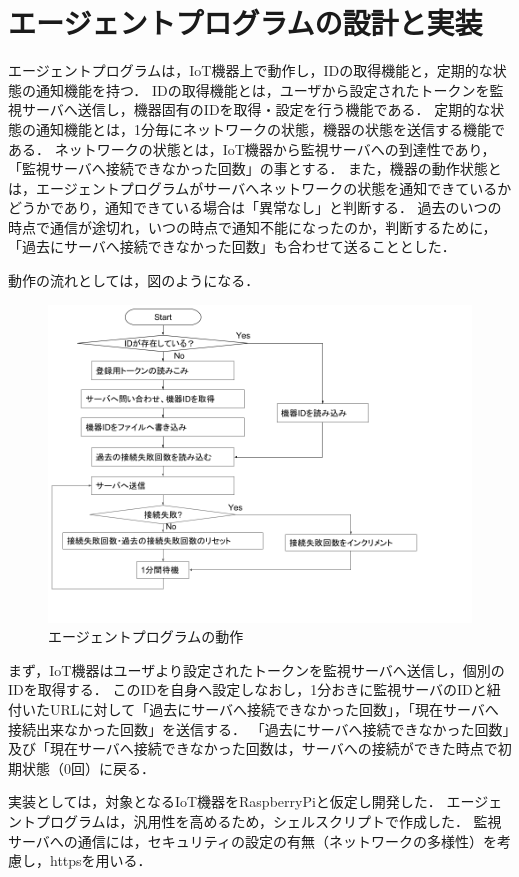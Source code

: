 \section{エージェントプログラムの設計と実装}
エージェントプログラムは，IoT機器上で動作し，IDの取得機能と，定期的な状態の通知機能を持つ．
IDの取得機能とは，ユーザから設定されたトークンを監視サーバへ送信し，機器固有のIDを取得・設定を行う機能である．
定期的な状態の通知機能とは，1分毎にネットワークの状態，機器の状態を送信する機能である．
ネットワークの状態とは，IoT機器から監視サーバへの到達性であり，「監視サーバへ接続できなかった回数」の事とする．
また，機器の動作状態とは，エージェントプログラムがサーバへネットワークの状態を通知できているかどうかであり，通知できている場合は「異常なし」と判断する．
過去のいつの時点で通信が途切れ，いつの時点で通知不能になったのか，判断するために，「過去にサーバへ接続できなかった回数」も合わせて送ることとした．

動作の流れとしては，図のようになる．
\begin{figure}[htbp]
\includegraphics[width=16cm]{images/agent_flow.png}
\caption{エージェントプログラムの動作}
\label{fig:agent_flow}
\end{figure}
まず，IoT機器はユーザより設定されたトークンを監視サーバへ送信し，個別のIDを取得する．
このIDを自身へ設定しなおし，1分おきに監視サーバのIDと紐付いたURLに対して「過去にサーバへ接続できなかった回数」，「現在サーバへ接続出来なかった回数」を送信する．
「過去にサーバへ接続できなかった回数」及び「現在サーバへ接続できなかった回数は，サーバへの接続ができた時点で初期状態（0回）に戻る．

実装としては，対象となるIoT機器をRaspberryPiと仮定し開発した．
エージェントプログラムは，汎用性を高めるため，シェルスクリプトで作成した．
監視サーバへの通信には，セキュリティの設定の有無（ネットワークの多様性）を考慮し，httpsを用いる．

